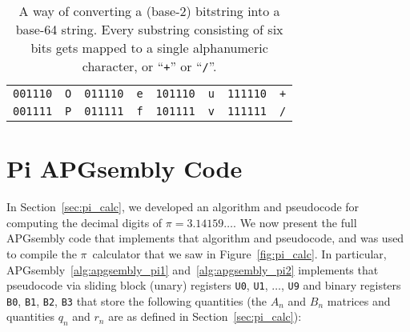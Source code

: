 \begin{table}[!htb]
\begin{center}
\begin{tabular}{cc|cc|cc|cc}
			\texttt{001110} & \texttt{O} & \texttt{011110} & \texttt{e} & \texttt{101110} & \texttt{u} & \texttt{111110} & \texttt{+} \\
			\texttt{001111} & \texttt{P} & \texttt{011111} & \texttt{f} & \texttt{101111} & \texttt{v} & \texttt{111111} & \texttt{/} \\\bottomrule
		\end{tabular}
		\caption{A way of converting a (base-2) bitstring into a base-64 string. Every substring consisting of six bits gets mapped to a single alphanumeric character, or ``\texttt{+}'' or ``\texttt{/}''.}\label{tab:base64}
	\end{center}
\end{table}


\section{Pi APGsembly Code}\label{sec:appendix_apg}

In Section~\ref{sec:pi_calc}, we developed an algorithm and pseudocode for computing the decimal digits of $\pi = 3.14159\ldots$. We now present the full APGsembly code that implements that algorithm and pseudocode, and was used to compile the $\pi$~calculator that we saw in Figure~\ref{fig:pi_calc}. In particular, APGsembly~\ref{alg:apgsembly_pi1} and~\ref{alg:apgsembly_pi2} implements that pseudocode via sliding block (unary) registers \texttt{U0}, \texttt{U1}, $\ldots$, \texttt{U9} and binary registers \texttt{B0}, \texttt{B1}, \texttt{B2}, \texttt{B3} that store the following quantities (the $A_n$ and $B_n$ matrices and quantities $q_n$ and $r_n$ are as defined in Section~\ref{sec:pi_calc}):\medskip

